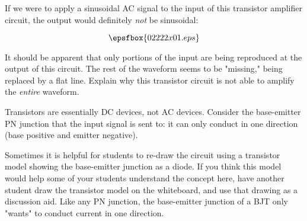 

If we were to apply a sinusoidal AC signal to the input of this transistor amplifier circuit, the output would definitely {\it not} be sinusoidal:

$$\epsfbox{02222x01.eps}$$

It should be apparent that only portions of the input are being reproduced at the output of this circuit.  The rest of the waveform seems to be "missing," being replaced by a flat line.  Explain why this transistor circuit is not able to amplify the {\it entire} waveform.







Transistors are essentially DC devices, not AC devices.  Consider the base-emitter PN junction that the input signal is sent to: it can only conduct in one direction (base positive and emitter negative).







Sometimes it is helpful for students to re-draw the circuit using a transistor model showing the base-emitter junction as a diode.  If you think this model would help some of your students understand the concept here, have another student draw the transistor model on the whiteboard, and use that drawing as a discussion aid.  Like any PN junction, the base-emitter junction of a BJT only "wants" to conduct current in one direction.




